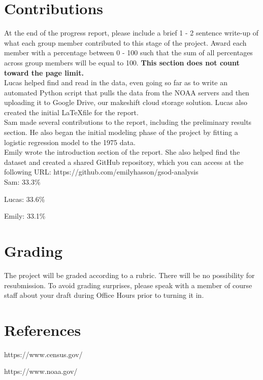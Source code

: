 \documentclass[conference]{IEEEtran}
\begin{document}
\section{Contributions}

At the end of the progress report, please include a brief 1 - 2 sentence write-up of what each group member contributed to this stage of the project. Award each member with a percentage between 0 - 100 such that the sum of all percentages across group members will be equal to 100. \textbf{This section does not count toward the page limit.} \\

Lucas helped find and read in the data, even going so far as to write an automated Python script that pulls the data from the NOAA servers and then uploading it to Google Drive, our makeshift cloud storage solution. Lucas also created the initial \LaTeX\space file for the report. \\

Sam made several contributions to the report, including the preliminary results section. He also began the initial modeling phase of the project by fitting a logistic regression model to the 1975 data. \\

Emily wrote the introduction section of the report. She also helped find the dataset and created a shared GitHub repository, which you can access at the following URL: https://github.com/emilyhasson/gsod-analysis \\

Sam: 33.3\%

Lucas: 33.6\%

Emily: 33.1\%

\section{Grading}

The project will be graded according to a rubric. There will be no possibility for resubmission. To avoid grading surprises, please speak with a member of course staff about your draft during Office Hours prior to turning it in.

\section{References}

https://www.census.gov/

https://www.noaa.gov/
\end{document}
